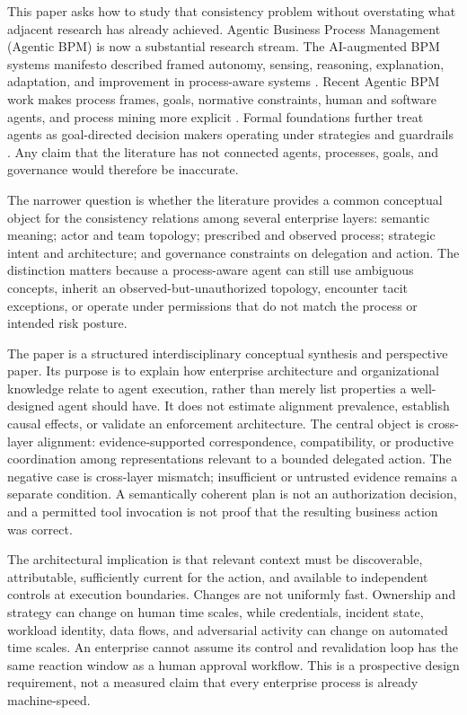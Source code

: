 \documentclass[11pt,letterpaper]{article}
\newcommand{\parencite}[1]{\citep{#1}}
\begin{document}
This paper asks how to study that consistency problem without overstating what adjacent research has already achieved. Agentic Business Process Management (Agentic BPM) is now a substantial research stream. The AI-augmented BPM systems manifesto described framed autonomy, sensing, reasoning, explanation, adaptation, and improvement in process-aware systems \parencite{dumas2023abpms}. Recent Agentic BPM work makes process frames, goals, normative constraints, human and software agents, and process mining more explicit \parencite{calvanese2025normative,calvanese2026manifesto,dumas2026abpms}. Formal foundations further treat agents as goal-directed decision makers operating under strategies and guardrails \parencite{degiacomo2026formal}. Any claim that the literature has not connected agents, processes, goals, and governance would therefore be inaccurate.

The narrower question is whether the literature provides a common conceptual object for the consistency relations among several enterprise layers: semantic meaning; actor and team topology; prescribed and observed process; strategic intent and architecture; and governance constraints on delegation and action. The distinction matters because a process-aware agent can still use ambiguous concepts, inherit an observed-but-unauthorized topology, encounter tacit exceptions, or operate under permissions that do not match the process or intended risk posture.

The paper is a structured interdisciplinary conceptual synthesis and perspective paper. Its purpose is to explain how enterprise architecture and organizational knowledge relate to agent execution, rather than merely list properties a well-designed agent should have. It does not estimate alignment prevalence, establish causal effects, or validate an enforcement architecture. The central object is cross-layer alignment: evidence-supported correspondence, compatibility, or productive coordination among representations relevant to a bounded delegated action. The negative case is cross-layer mismatch; insufficient or untrusted evidence remains a separate condition. A semantically coherent plan is not an authorization decision, and a permitted tool invocation is not proof that the resulting business action was correct.

The architectural implication is that relevant context must be discoverable, attributable, sufficiently current for the action, and available to independent controls at execution boundaries. Changes are not uniformly fast. Ownership and strategy can change on human time scales, while credentials, incident state, workload identity, data flows, and adversarial activity can change on automated time scales. An enterprise cannot assume its control and revalidation loop has the same reaction window as a human approval workflow. This is a prospective design requirement, not a measured claim that every enterprise process is already machine-speed.
\end{document}
